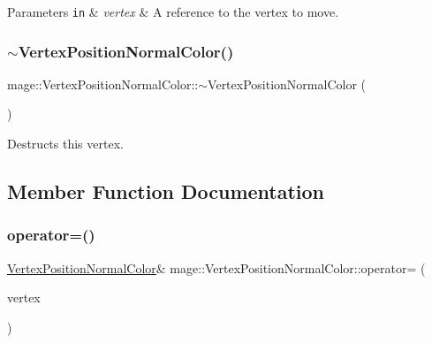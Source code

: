 \begin{DoxyParams}[1]{Parameters}
\mbox{\tt in}  & {\em vertex} & A reference to the vertex to move. \\
\hline
\end{DoxyParams}
\hypertarget{structmage_1_1_vertex_position_normal_color_a4c51d0599843601d1cc1a6a55149aafe}{}\label{structmage_1_1_vertex_position_normal_color_a4c51d0599843601d1cc1a6a55149aafe} 
\subsubsection{\texorpdfstring{$\sim$\+Vertex\+Position\+Normal\+Color()}{~VertexPositionNormalColor()}}
{\footnotesize\ttfamily mage\+::\+Vertex\+Position\+Normal\+Color\+::$\sim$\+Vertex\+Position\+Normal\+Color (\begin{DoxyParamCaption}{ }\end{DoxyParamCaption})\hspace{0.3cm}{\ttfamily [default]}}

Destructs this vertex. 

\subsection{Member Function Documentation}
\hypertarget{structmage_1_1_vertex_position_normal_color_aff39199b81977d3479976c83f7f51a4f}{}\label{structmage_1_1_vertex_position_normal_color_aff39199b81977d3479976c83f7f51a4f} 
\subsubsection{\texorpdfstring{operator=()}{operator=()}\hspace{0.1cm}{\footnotesize\ttfamily [1/2]}}
{\footnotesize\ttfamily \hyperlink{structmage_1_1_vertex_position_normal_color}{Vertex\+Position\+Normal\+Color}\& mage\+::\+Vertex\+Position\+Normal\+Color\+::operator= (\begin{DoxyParamCaption}\item[{const \hyperlink{structmage_1_1_vertex_position_normal_color}{Vertex\+Position\+Normal\+Color} \&}]{vertex }\end{DoxyParamCaption})\hspace{0.3cm}{\ttfamily [default]}}

